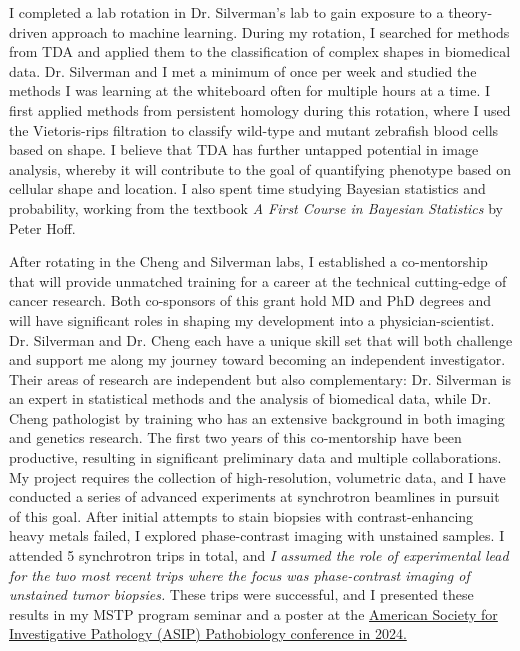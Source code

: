 \documentclass{NIHGrant}
\begin{document}
I completed a lab rotation in Dr. Silverman's lab to gain exposure to a theory-driven approach to machine learning. During my rotation, I searched for methods from TDA and applied them to the classification of complex shapes in biomedical data. Dr. Silverman and I met a minimum of once per week and studied the methods I was learning at the whiteboard often for multiple hours at a time. I first applied methods from persistent homology during this rotation, where I used the Vietoris-rips filtration to classify wild-type and mutant zebrafish blood cells based on shape. I believe that TDA has further untapped potential in image analysis, whereby it will contribute to the goal of quantifying phenotype based on cellular shape and location. I also spent time studying Bayesian statistics and probability, working from the textbook \textit{A First Course in Bayesian Statistics} by Peter Hoff.

After rotating in the Cheng and Silverman labs, I established a co-mentorship that will provide unmatched training for a career at the technical cutting-edge of cancer research. {Both co-sponsors of this grant hold MD and PhD degrees and will have significant roles in shaping my development into a physician-scientist.} Dr. Silverman and Dr. Cheng each have a unique skill set that will both challenge and support me along my journey toward becoming an independent investigator. Their areas of research are independent but also complementary: Dr. Silverman is an expert in statistical methods and the analysis of biomedical data, while Dr. Cheng pathologist by training who has an extensive background in both imaging and genetics research. The first two years of this co-mentorship have been productive, resulting in significant preliminary data and multiple collaborations. My project requires the collection of high-resolution, volumetric data, and I have conducted a series of advanced experiments at synchrotron beamlines in pursuit of this goal. After initial attempts to stain biopsies with contrast-enhancing heavy metals failed, I explored phase-contrast imaging with unstained samples. I attended 5 synchrotron trips in total, and \emph{I assumed the role of experimental lead for the two most recent trips where the focus was phase-contrast imaging of unstained tumor biopsies.} These trips were successful, and I presented these results in my MSTP program seminar and a poster at the \uline{American Society for Investigative Pathology (ASIP) Pathobiology conference in 2024.}
\end{document}
